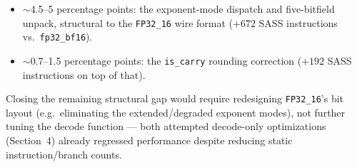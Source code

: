\documentclass[11pt]{article}
\begin{document}
\begin{itemize}
\item $\sim$4.5--5 percentage points: the exponent-mode dispatch and five-bitfield unpack, structural to the \texttt{FP32\_16} wire format ($+672$ SASS instructions vs.\ \texttt{fp32\_bf16}).
\item $\sim$0.7--1.5 percentage points: the \texttt{is\_carry} rounding correction ($+192$ SASS instructions on top of that).
\end{itemize}

Closing the remaining structural gap would require redesigning \texttt{FP32\_16}'s bit layout (e.g.\ eliminating the extended/degraded exponent modes), not further tuning the decode function --- both attempted decode-only optimizations (Section~4) already regressed performance despite reducing static instruction/branch counts.
\end{document}
